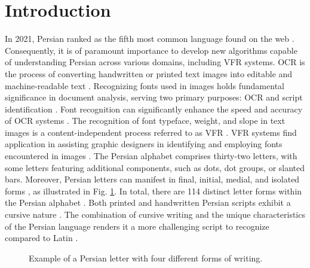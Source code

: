 \documentclass[conference]{IEEEtran}
\begin{document}
 \section{Introduction}
In 2021, Persian ranked as the fifth most common language found on the web \cite{23}. Consequently, it is of paramount importance to develop new algorithms capable of understanding Persian across various domains, including VFR systems.
OCR is the process of converting handwritten or printed text images into editable and machine-readable text \cite{31}. Recognizing fonts used in images holds fundamental significance in document analysis, serving two primary purposes: OCR and script identification \cite{26, 27}. Font recognition can significantly enhance the speed and accuracy of OCR systems \cite{24, 21}.
The recognition of font typeface, weight, and slope in text images is a content-independent process referred to as VFR \cite{25}. VFR systems find application in assisting graphic designers in identifying and employing fonts encountered in images \cite{22}.
The Persian alphabet comprises thirty-two letters, with some letters featuring additional components, such as dots, dot groups, or slanted bars. Moreover, Persian letters can manifest in final, initial, medial, and isolated forms \cite{34}, as illustrated in Fig. \ref{fig:letters}. In total, there are 114 distinct letter forms within the Persian alphabet \cite{16}.
Both printed and handwritten Persian scripts exhibit a cursive nature \cite{34}. The combination of cursive writing and the unique characteristics of the Persian language renders it a more challenging script to recognize compared to Latin \cite{34}.


\begin{figure}[t] 
\caption{Example of a Persian letter with four different forms of writing.}
\label{fig:letters}
\end{figure}  
\end{document}
